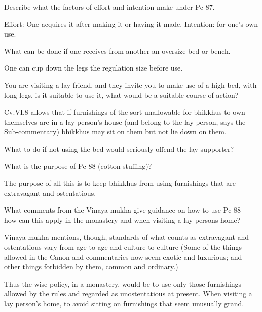 \bigskip

Describe what the factors of effort and intention make under Pc 87.

\begin{solution}
  Effort: One acquires it after making it or having it made. Intention: for
  one’s own use.
\end{solution}

\bigskip

What can be done if one receives from another an oversize bed or bench.

\begin{solution}
  One can cup down the legs the regulation size before use.
\end{solution}

\bigskip

You are visiting a lay friend, and they invite you to make use of a high bed,
with long legs, is it suitable to use it, what would be a suitable course of
action?

\begin{solution}
  Cv.VI.8 allows that if furnishings of the sort unallowable for bhikkhus to own
  themselves are in a lay person’s house (and belong to the lay person, says the
  Sub-commentary) bhikkhus may sit on them but not lie down on them.
\end{solution}

\bigskip

What to do if not using the bed would seriously offend the lay supporter?


What is the purpose of Pc 88 (cotton stuffing)? 

\begin{solution}
  The purpose of all this is to keep bhikkhus from using furnishings that are
  extravagant and ostentatious.
\end{solution}

\bigskip

What comments from the Vinaya-mukha give guidance on how to use Pc 88 – how
can this apply in the monastery and when visiting a lay persons home?

\begin{solution}
  Vinaya-mukha mentions, though, standards of what counts as extravagant and
  ostentatious vary from age to age and culture to culture (Some of the things
  allowed in the Canon and commentaries now seem exotic and luxurious; and other
  things forbidden by them, common and ordinary.)

  Thus the wise policy, in a monastery, would be to use only those furnishings
  allowed by the rules and regarded as unostentatious at present. When visiting
  a lay person’s home, to avoid sitting on furnishings that seem unusually
  grand.
\end{solution}

